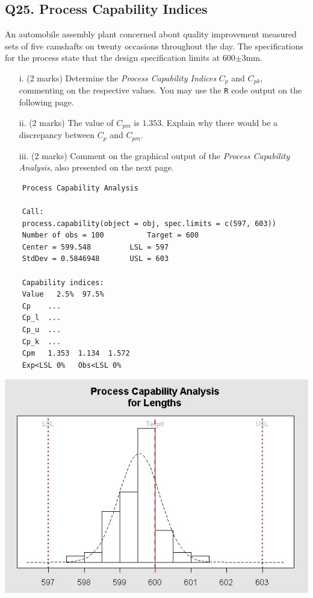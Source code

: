 \documentclass[a4paper,12pt]{article}
\begin{document}
\subsection*{Q25. Process Capability Indices}

An automobile assembly plant concerned about quality improvement measured sets of five camshafts on twenty occasions throughout the day. The specifications for the process state that the design specification limits at 600$\pm$3mm.


\begin{itemize}
	\item[i.] (2 marks) Determine the \emph{Process Capability Indices} $C_p$ and $C_{pk}$, commenting on the respective values. You may use the \texttt{R} code output on the following page.
	\item[ii.] (2 marks)  The value of $C_{pm}$ is $1.353$. Explain why there would be a discrepancy between $C_p$ and $C_{pm}$.
	\item[iii.] (2 marks) Comment on the graphical output of the \emph{Process Capability Analysis}, also presented on the next page.
\end{itemize}


\newpage
\begin{framed}
	\begin{verbatim}
	Process Capability Analysis
	
	Call:
	process.capability(object = obj, spec.limits = c(597, 603))
	Number of obs = 100          Target = 600
	Center = 599.548         LSL = 597
	StdDev = 0.5846948       USL = 603
	
	Capability indices:
	Value   2.5%  97.5%
	Cp    ...
	Cp_l  ...
	Cp_u  ...
	Cp_k  ...
	Cpm   1.353  1.134  1.572
	Exp<LSL 0%   Obs<LSL 0%
	\end{verbatim}
\end{framed}



\begin{center}
	\includegraphics[scale=0.55]{images/ExamQ4hist}
\end{center}
\newpage
%
%
%
\end{document}
